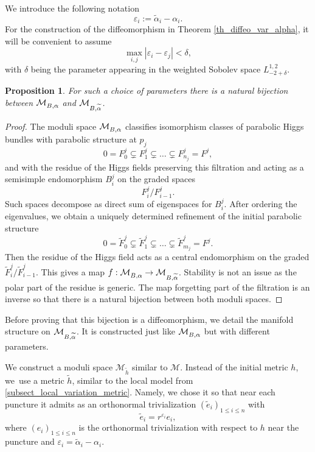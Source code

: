 \documentclass[JEP,XML,SOM,NoEqCountersInSection,Unicode,published]{cedram}
\newcommand{\NoChangel}[1]{%
\expandafter\let\csname old\string#1\endcsname=#1
\let#1=\relax
\newcommand{#1}{\mathcode`l="716C\csname old\string#1\endcsname\mathcode`l="7160 }%
}
\newcommand{\Dol}{\mathrm{Dol}}\NoChangel{\Dol}
\let\epsilon\varepsilon
\theoremstyle{definition}
\theoremstyle{plain}
\newtheorem{proposition}[definition]{Proposition}
\begin{document}
We introduce the following notation
\[
\epsilon_i := \widetilde{\alpha}_i-\alpha_i.
\]
For the construction of the diffeomorphism in Theorem \ref{th_diffeo_var_alpha}, it will be convenient to assume
\[
\max_{i,j}|\epsilon_i-\epsilon_j| < \delta,
\]
with $\delta$ being the parameter appearing in the weighted Sobolev space $L^{1,2}_{-2+\delta}$.
\begin{proposition}\label{prop_bijection_dol}
For such a choice of parameters there is a natural bijection between $\mathcal{M}^{\Dol}_{B,\alpha}$ and $\mathcal{M}^{\Dol}_{B,\widetilde{\alpha}}$.
\end{proposition}
\begin{proof}
The moduli space $\mathcal{M}^{\Dol}_{B,\alpha}$ classifies isomorphism classes of parabolic Higgs bundles with parabolic structure at $p_j$
\[
0= F^j_0 \subsetneq F^j_1 \subsetneq \dots \subsetneq F^j_{n_j}=F^j,
\]
and with the residue of the Higgs fields preserving this filtration and acting as a semisimple endomorphism $B^j_i$ on the graded spaces
\[
F^j_i / F^j_{i-1}.
\]
Such spaces decompose as direct sum of eigenspaces for $B^j_i$. After ordering the eigenvalues, we obtain a uniquely determined refinement of the initial parabolic structure
\[
0 = \widetilde{F}^j_0 \subsetneq \widetilde{F}^j_1 \subsetneq \dots \subsetneq \widetilde{F}^j_{m_j} = F^j.
\]
Then the residue of the Higgs field acts as a central endomorphism on the graded $\widetilde{F}^j_i / \widetilde{F}^j_{i-1}$.
This gives a map $f:\mathcal{M}^{\Dol}_{B,\alpha}\to \mathcal{M}^{\Dol}_{B,\widetilde{\alpha}}$. Stability is not an issue as the polar part of the residue is generic. The map forgetting part of the filtration is an inverse so that there is a natural bijection between both moduli spaces.
\end{proof}

Before proving that this bijection is a diffeomorphism, we detail the manifold structure on $\mathcal{M}_{B,\widetilde{\alpha}}^{\Dol}$. It is constructed just like $\mathcal{M}^{\Dol}_{B,\alpha}$ but with different parameters.

We construct a moduli space $\mathcal{M}_{\widetilde{h}}$ similar to $\mathcal{M}$. Instead of the initial metric $h$, we~use a metric $\widetilde{h}$, similar to the local model from \ref{subsect_local_variation_metric}. Namely, we chose it so that near each puncture it admits as an orthonormal trivialization $(\widetilde{e}_i)_{1\le i \le n}$ with
\[
\widetilde{e}_i = r^{\epsilon_i} e_i,
\]
where $(e_i)_{1\le i \le n}$ is the orthonormal trivialization with respect to $h$ near the puncture and $\epsilon_i=\widetilde{\alpha}_i-\alpha_i$.
\end{document}
